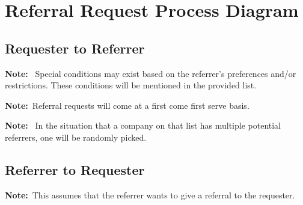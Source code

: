 \documentclass[letterpaper, 12pt]{article}
\newcommand{\note}[1]{\textbf{Note:}~#1}
\begin{document}
\section{Referral Request Process Diagram}

\subsection{Requester to Referrer}

\label{fig:requesterToReferrer}

\note{%
    Special conditions may exist based on the referrer's preferences and/or
    restrictions. These conditions will be mentioned in the provided list.
}

\note{Referral requests will come at a first come first serve basis.}

\note{%
    In the situation that a company on that list has multiple potential
    referrers, one will be randomly picked.
}

\subsection{Referrer to Requester }

\label{fig:referrerToRequester}


\note{This assumes that the referrer wants to give a referral to the requester.}
\end{document}

